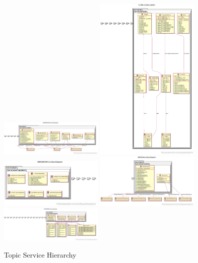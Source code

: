 \begin{figure}[htp]
\centering
\includegraphics[width=5cm]{images/Topiccontroller}
\includegraphics[width=5cm]{images/Topicmodel}
\includegraphics[width=5cm]{images/Topicrepository}
\includegraphics[width=5cm]{images/Topicservices}
\includegraphics[width=5cm]{images/Topicexception}
\caption{Topic Service Hierarchy}
\label{fig:lion}
\end{figure}